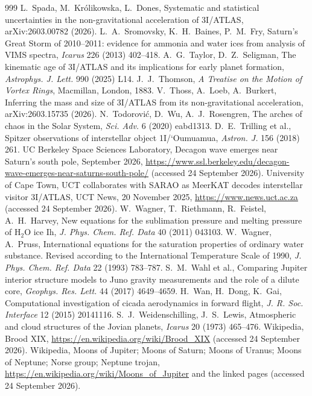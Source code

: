 \documentclass[11pt]{article}
\theoremstyle{definition}\newtheorem{definition}[theorem]{Definition}
\theoremstyle{remark}\newtheorem{remark}[theorem]{Remark}
\begin{document}
\begin{thebibliography}{999}
 L.~Spada, M.~Kr\'olikowska, L.~Dones, Systematic and statistical uncertainties in the non-gravitational acceleration of 3I/ATLAS, arXiv:2603.00782 (2026).
 L.~A.~Sromovsky, K.~H.~Baines, P.~M.~Fry, Saturn's Great Storm of 2010--2011: evidence for ammonia and water ices from analysis of VIMS spectra, \emph{Icarus} 226 (2013) 402--418.
 A.~G.~Taylor, D.~Z.~Seligman, The kinematic age of 3I/ATLAS and its implications for early planet formation, \emph{Astrophys. J. Lett.} 990 (2025) L14.
 J.~J.~Thomson, \emph{A Treatise on the Motion of Vortex Rings}, Macmillan, London, 1883.
 V.~Thoss, A.~Loeb, A.~Burkert, Inferring the mass and size of 3I/ATLAS from its non-gravitational acceleration, arXiv:2603.15735 (2026).
 N.~Todorovi\'c, D.~Wu, A.~J.~Rosengren, The arches of chaos in the Solar System, \emph{Sci. Adv.} 6 (2020) eabd1313.
 D.~E.~Trilling et al., Spitzer observations of interstellar object 1I/\textquoteleft Oumuamua, \emph{Astron. J.} 156 (2018) 261.
 UC Berkeley Space Sciences Laboratory, Decagon wave emerges near Saturn's south pole, September 2026, \url{https://www.ssl.berkeley.edu/decagon-wave-emerges-near-saturns-south-pole/} (accessed 24 September 2026).
 University of Cape Town, UCT collaborates with SARAO as MeerKAT decodes interstellar visitor 3I/ATLAS, UCT News, 20 November 2025, \url{https://www.news.uct.ac.za} (accessed 24 September 2026).
 W.~Wagner, T.~Riethmann, R.~Feistel, A.~H.~Harvey, New equations for the sublimation pressure and melting pressure of H$_2$O ice Ih, \emph{J. Phys. Chem. Ref. Data} 40 (2011) 043103.
 W.~Wagner, A.~Pruss, International equations for the saturation properties of ordinary water substance. Revised according to the International Temperature Scale of 1990, \emph{J. Phys. Chem. Ref. Data} 22 (1993) 783--787.
 S.~M.~Wahl et al., Comparing Jupiter interior structure models to Juno gravity measurements and the role of a dilute core, \emph{Geophys. Res. Lett.} 44 (2017) 4649--4659.
 H.~Wan, H.~Dong, K.~Gai, Computational investigation of cicada aerodynamics in forward flight, \emph{J. R. Soc. Interface} 12 (2015) 20141116.
 S.~J.~Weidenschilling, J.~S.~Lewis, Atmospheric and cloud structures of the Jovian planets, \emph{Icarus} 20 (1973) 465--476.
 Wikipedia, Brood XIX, \url{https://en.wikipedia.org/wiki/Brood_XIX} (accessed 24 September 2026).
 Wikipedia, Moons of Jupiter; Moons of Saturn; Moons of Uranus; Moons of Neptune; Norse group; Neptune trojan, \url{https://en.wikipedia.org/wiki/Moons_of_Jupiter} and the linked pages (accessed 24 September 2026).

\end{thebibliography}
\end{document}
